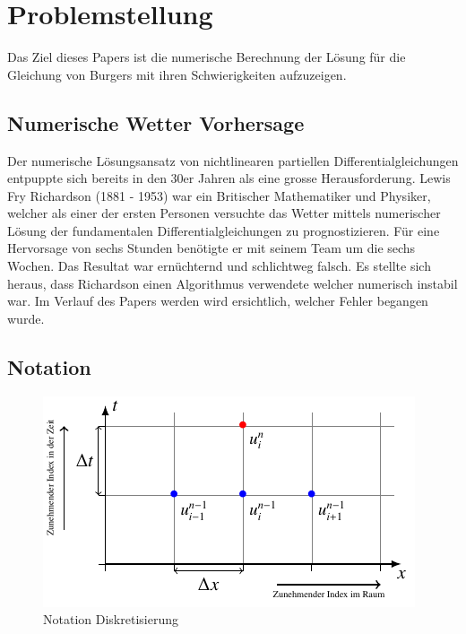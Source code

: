 %
%
\section{Problemstellung
\label{burgers:section:problemstellung}}

	Das Ziel dieses Papers ist die numerische Berechnung der Lösung für die Gleichung von Burgers mit ihren Schwierigkeiten aufzuzeigen.



	\subsection{Numerische Wetter Vorhersage}
	\label{burgers:sec:nwp}

	Der numerische L\"osungsansatz von nichtlinearen partiellen Differentialgleichungen entpuppte sich bereits in den 30er Jahren als eine grosse Herausforderung.
	Lewis Fry Richardson (1881 - 1953) war ein Britischer Mathematiker und Physiker, welcher als einer der ersten Personen versuchte das Wetter mittels numerischer Lösung der fundamentalen Differentialgleichungen zu prognostizieren.
	F\"ur eine Hervorsage von sechs Stunden ben\"otigte er mit seinem Team um die sechs Wochen.
	Das Resultat war ern\"uchternd und schlichtweg falsch.
	Es stellte sich heraus, dass Richardson einen Algorithmus verwendete welcher numerisch instabil war.
	Im Verlauf des Papers werden wird ersichtlich, welcher Fehler begangen wurde.

	\subsection{Notation}

     \begin{figure}
       \centering
       \includegraphics[width=.8\textwidth]{papers/burgers/BurgersEquation/tikz/Gitter/gitter.pdf}
       \caption{Notation Diskretisierung}
       \label{burgers:fig:Disk}
     \end{figure}


